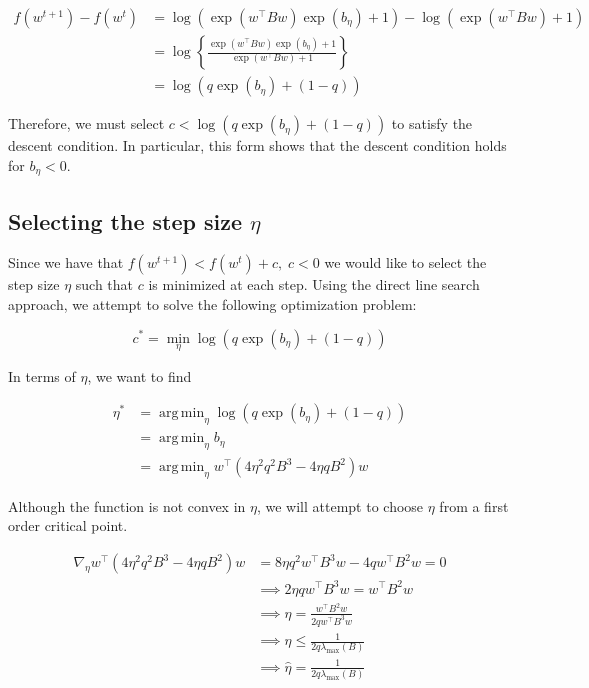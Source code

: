 \documentclass[11pt]{article}
\DeclareMathOperator*{\argmin}{arg\,min}
\begin{document}
\begin{align*}
    f(w^{t+1}) - f(w^t) &= 
    \log(\exp(w^{\top}Bw)\exp(b_\eta ) + 1) - \log(\exp(w^{\top}Bw) + 1) \\
    &= \log \left\{ \frac{\exp(w^{\top}Bw)\exp(b_\eta ) + 1}{\exp(w^{\top}Bw) + 1} \right\} \\
    &= \log( q \exp(b_\eta ) + (1 - q))
\end{align*}

Therefore, we must select $c < \log( q \exp(b_\eta ) + (1 - q))$ to satisfy the descent condition. In particular, this form shows that the descent condition holds for $b_\eta < 0$.

\subsection{Selecting the step size $\eta$}

Since we have that $f(w^{t+1}) < f(w^t) + c, \; c < 0$ we would like to select the step size $\eta$ such that $c$ is minimized at each step. Using the direct line search approach, we attempt to solve the following optimization problem:

\begin{equation}
    c^* = \min_{\eta} \log( q \exp(b_\eta ) + (1 - q))
\end{equation}

In terms of $\eta$, we want to find

\begin{equation}
\label{eq:eta_opt}
\begin{split}
    \eta^* &= \argmin_{\eta} \log( q \exp(b_\eta ) + (1 - q)) \\
    &= \argmin_{\eta} b_\eta \\
    &= \argmin_{\eta} w^{\top} ( 4 \eta^2 q^2 B^3 - 4 \eta q B^2)w
\end{split}
\end{equation}

Although the function is not convex in $\eta$, we will attempt to choose $\eta$ from a first order critical point.

\begin{align*}
\nabla_{\eta} w^{\top} ( 4 \eta^2 q^2 B^3 - 4 \eta q B^2)w 
&= 8 \eta q^2 w^{\top} B^3 w - 4 q w^{\top} B^2 w = 0 \\
&\implies 2 \eta q w^{\top} B^3 w = w^{\top} B^2 w \\
&\implies \eta = \frac{w^{\top} B^2 w}{2 q w^{\top} B^3 w} \\ 
&\implies \eta \leq \frac{1}{2q\lambda_{\max}(B)} \\
&\implies \hat{\eta} = \frac{1}{2q\lambda_{\max}(B)}
\end{align*}
\end{document}

